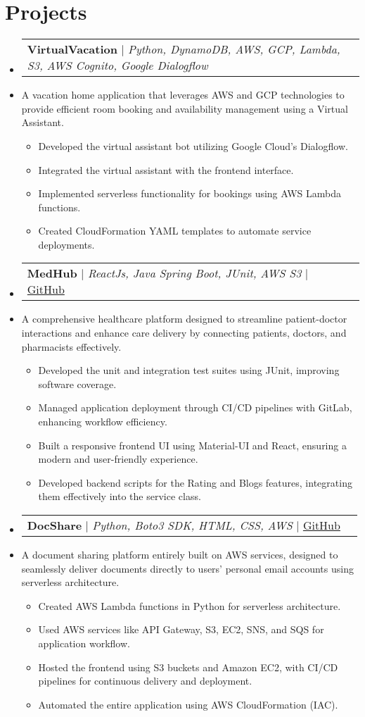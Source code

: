 \documentclass[letterpaper,11pt]{article}
\makeatletter
\newcommand{\resumeItem}[1]{
    \item\small{
            {#1 \vspace{-2pt}}
    }
}
\newcommand{\resumeProjectHeading}[2]{
    \item
    \begin{tabular*}{1.001\textwidth}{l@{\extracolsep{\fill}}r}
        \small#1 & \textbf{\small #2} \\
    \end{tabular*}\vspace{-7pt}
}
\newcommand{\resumeSubHeadingListStart}{\begin{itemize}[leftmargin=0.0in, label={}]}
\newcommand{\resumeSubHeadingListEnd}{\end{itemize}}
\newcommand{\resumeItemListStart}{\justify \begin{itemize}}
\newcommand{\resumeItemListEnd}{\end{itemize}\vspace{-2pt}}
\makeatother
\begin{document}
\section{Projects}
\vspace{-5pt}
\resumeSubHeadingListStart

\resumeProjectHeading
{\textbf{VirtualVacation} $|$ \emph{Python, DynamoDB, AWS, GCP, Lambda, S3, AWS Cognito, Google Dialogflow}}{}
\setlength{\baselineskip}{5pt}
\resumeItem{A vacation home application that leverages AWS and GCP technologies to provide efficient room booking and availability management using a Virtual Assistant.}
\resumeItemListStart
\resumeItem{Developed the virtual assistant bot utilizing Google Cloud's Dialogflow.}
\resumeItem{Integrated the virtual assistant with the frontend interface.}
\resumeItem{Implemented serverless functionality for bookings using AWS Lambda functions.}
\resumeItem{Created CloudFormation YAML templates to automate service deployments.}
\resumeItemListEnd
\vspace{5pt}
\resumeProjectHeading
{\textbf{MedHub} $|$ \emph{ReactJs, Java Spring Boot, JUnit, AWS S3} $|$ \href{https://github.com/abhilatawa/MedHub}{GitHub}}{}
\setlength{\baselineskip}{5pt}
\resumeItem{A comprehensive healthcare platform designed to streamline patient-doctor interactions and enhance care delivery by connecting patients, doctors, and pharmacists effectively.}
\resumeItemListStart
\resumeItem{ Developed the unit and integration test suites using JUnit, improving software coverage.}
\resumeItem{Managed application deployment through CI/CD pipelines with GitLab, enhancing workflow efficiency.}
\resumeItem{Built a responsive frontend UI using Material-UI and React, ensuring a modern and user-friendly experience.}
\resumeItem{Developed backend scripts for the Rating and Blogs features, integrating them effectively into the service class.}
\resumeItemListEnd

\vspace{5pt}
\resumeProjectHeading
{\textbf{DocShare} $|$ \emph{Python, Boto3 SDK, HTML, CSS, AWS} $|$ \href{https://github.com/abhilatawa/AWS-Cloud-Project_DocShare/tree/main/DocShare}{GitHub}}{}
\setlength{\baselineskip}{5pt}
\resumeItem{A document sharing platform entirely built on AWS services, designed to seamlessly deliver documents directly to users' personal email accounts using serverless architecture.}
\resumeItemListStart
\resumeItem{Created AWS Lambda functions in Python for serverless architecture.}
\resumeItem{Used AWS services like API Gateway, S3, EC2, SNS, and SQS for application workflow.}
\resumeItem{Hosted the frontend using S3 buckets and Amazon EC2, with CI/CD pipelines for continuous delivery and deployment.}
\resumeItem{Automated the entire application using AWS CloudFormation (IAC).}
\resumeItemListEnd
\resumeSubHeadingListEnd
\end{document}
